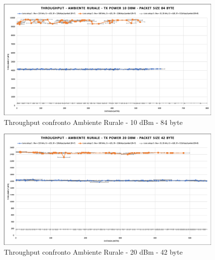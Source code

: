 \documentclass[12pt,a4paper,openright,twoside]{report}
\begin{document}
\begin{figure}[h]                      
\begin{center} 
\includegraphics[width=\textwidth]{THROUGHPUT_confronto_AR_10dBm_84byte.png}
\caption[Throughput confronto Ambiente Rurale - 10 dBm - 84 byte]{Throughput confronto Ambiente Rurale - 10 dBm - 84 byte}\label{fig:prima}
\end{center}
\end{figure}

\begin{figure}[h]                      
\begin{center} 
\includegraphics[width=\textwidth]{THROUGHPUT_confronto_AR_20dBm_42byte.png}
\caption[Throughput confronto Ambiente Rurale - 20 dBm - 42 byte]{Throughput confronto Ambiente Rurale - 20 dBm - 42 byte}\label{fig:prima}
\end{center}
\end{figure}
\end{document}
